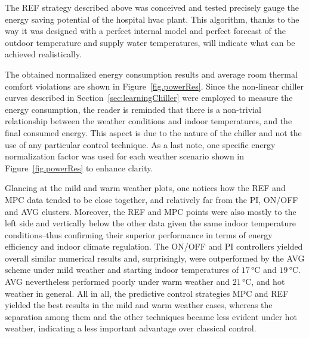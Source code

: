 The REF strategy described above was conceived and tested precisely gauge the energy saving potential of the hospital \ac{hvac} plant. This algorithm, thanks to the way it was designed with a perfect internal model and perfect forecast of the outdoor temperature and supply water temperatures, will indicate what can be achieved realistically.

The obtained normalized energy consumption results and average room thermal comfort violations are shown in Figure~\ref{fig.powerRes}. Since the non-linear chiller curves described in Section~\ref{sec:learningChiller} were employed to measure the energy consumption, the reader is reminded that there is a non-trivial relationship between the weather conditions and indoor temperatures, and the final consumed energy. This aspect is due to the nature of the chiller and not the use of any particular control technique. As a last note, one specific energy normalization factor was used for each weather scenario shown in Figure~\ref{fig.powerRes} to enhance clarity.

Glancing at the mild and warm weather plots, one notices how the REF and MPC data tended to be close together, and relatively far from the PI, ON/OFF and AVG clusters. Moreover, the REF and MPC points were also mostly to the left side and vertically below the other data given the same indoor temperature conditions--thus confirming their superior performance in terms of energy efficiency and indoor climate regulation. The ON/OFF and PI controllers yielded overall similar numerical results and, surprisingly, were outperformed by the AVG scheme under mild weather and starting indoor temperatures of $17\,$°C and $19\,$°C. AVG nevertheless performed poorly under warm weather and $21\,$°C, and hot weather in general. All in all, the predictive control strategies MPC and REF yielded the best results in the mild and warm weather cases, whereas the separation among them and the other techniques became less evident under hot weather, indicating a less important advantage over classical control.

